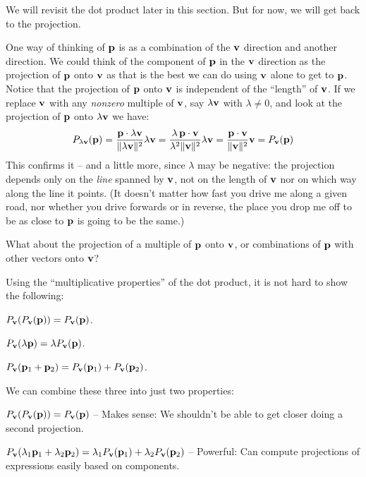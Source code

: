 \documentclass[12pt]{article}
\begin{document}
We will revisit the dot product later in this section. But for now, we will 
get back to the projection.

One way of thinking of ${\bf p}$ is as a combination of the ${\bf v}$ direction 
and another direction. We could think of the component of ${\bf p}$ in 
the ${\bf v}$ direction as 
the projection of ${\bf p}$ onto ${\bf v}$ as that is the best we can do 
using ${\bf v}$ alone to get to ${\bf p}$.
Notice that the projection of ${\bf p}$ onto ${\bf v}$ is independent of 
the ``length'' of ${\bf v}$.
If we replace ${\bf v}$ with any {\em nonzero\/} multiple of ${\bf v}$, say
$\lambda {\bf v}$ with $\lambda \neq 0$,
and look at the projection of
${\bf p}$ onto $\lambda {\bf v}$ we have:
$$ P_{\lambda {\bf v}}({\bf p}) = \frac{{\bf p} \cdot \lambda {\bf v}}{\|\lambda {\bf v}\|^2} \lambda {\bf v} =
\frac{\lambda \, {\bf p} \cdot {\bf v}}{\lambda^2 \|{\bf v}\|^2} \lambda {\bf v}
= \frac{{\bf p} \cdot {\bf v}}{\|{\bf v}\|^2} {\bf v} = P_{{\bf v}}({\bf p})$$
This confirms it -- and a little more, since $\lambda$ may be negative: the
projection depends only on the {\em line\/} spanned by ${\bf v}$, not on the
length of ${\bf v}$ nor on which way along the line it points.
(It doesn't matter how fast you drive me along a given road, nor whether
you drive forwards or in reverse, the place 
you drop me off to be as close to ${\bf p}$ is going to be the same.)

What about the projection of a multiple of ${\bf p}$ onto ${\bf v}$, or
combinations of ${\bf p}$ with other vectors onto ${\bf v}$?

Using the ``multiplicative properties'' of the dot product, 
it is not hard to show the following: 
\bi
  \item $P_{\bf v}(P_{\bf v}({\bf p})) = P_{\bf v}({\bf p})$.
  \item $P_{\bf v}(\lambda {\bf p}) = \lambda P_{\bf v}({\bf p})$.
  \item $P_{\bf v}({\bf p}_1 + {\bf p}_2) = P_{\bf v}({\bf p}_1) + P_{\bf v}({\bf p}_2)$.
\ei

We can combine these three into just two properties:
\bi
  \item  $P_{\bf v}(P_{\bf v}({\bf p})) = P_{\bf v}({\bf p})$ -- Makes sense: 
      We shouldn't be able to get closer doing a second projection.
\item  $P_{\bf v}(\lambda_1 {\bf p}_1 + \lambda_2 {\bf p}_2) =
    \lambda_1 P_{\bf v}({\bf p}_1) + \lambda_2 P_{\bf v}({\bf p}_2)$ --
    Powerful: Can compute projections of expressions easily based on components. 
\ei
\end{document}
